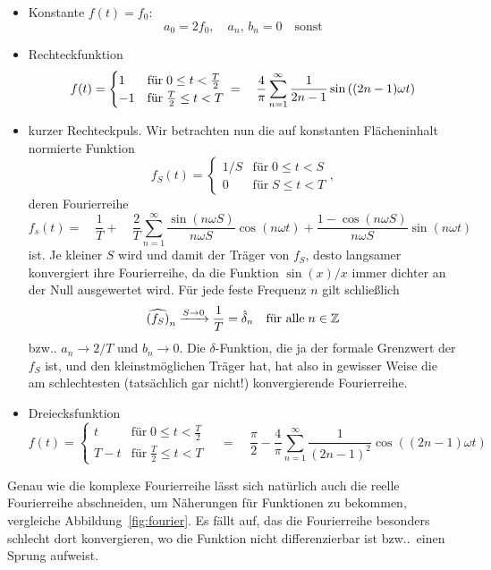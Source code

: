 \begin{itemize}
\item Konstante $f(t) = f_0$:
  \begin{equation}
    a_0 = 2 f_0,\quad a_n,\,b_n= 0\quad\text{sonst}
  \end{equation}
\item Rechteckfunktion
  \begin{equation}
    f(t) = \begin{cases}
      1 &\text{für}\; 0 \le t < \frac{T}{2} \\
      -1  &\text{für}\; \frac{T}{2} \le t < T
    \end{cases}\\
    = \quad\frac{4}{\pi}\sum_{n=1}^\infty
    \frac{1}{2n-1}\sin\left((2n-1)\omega t\right)
  \end{equation}
\item kurzer Rechteckpuls. Wir betrachten nun die auf konstanten
  Flächeninhalt normierte Funktion
  \begin{equation}
    f_S(t) = \begin{cases}
      1/S &\text{für}\; 0 \le t < S \\
      0  &\text{für}\; S \le t < T
    \end{cases},
  \end{equation}
  deren Fourierreihe
  \begin{equation}
    f_s(t) =
    \quad \frac{1}{T} +
    \quad\frac{2}{T}\sum_{n=1}^\infty
    \frac{\sin(n\omega S)}{n\omega S}\cos(n\omega t) +
    \frac{1-\cos(n\omega S)}{n\omega S}\sin(n\omega t)
  \end{equation}
  ist. Je kleiner $S$ wird und damit der Träger von $f_S$, desto
  langsamer konvergiert ihre Fourierreihe, da die Funktion $\sin(x)/x$
  immer dichter an der Null ausgewertet wird. Für jede feste Frequenz
  $n$ gilt schließlich
  \begin{equation}
    \widehat{\left(f_S\right)}_n \xrightarrow{S\to 0} \frac{1}{T} = \hat\delta_n
    \quad\text{für alle}\;n\in\mathbb{Z}
  \end{equation}
  bzw.. $a_n\to 2/T$ und $b_n\to 0$. Die $\delta$-Funktion, die ja der
  formale Grenzwert der $f_S$ ist, und den kleinstmöglichen
  Träger hat, hat also in gewisser Weise die am schlechtesten
  (tatsächlich gar nicht!) konvergierende Fourierreihe.
\item Dreiecksfunktion
  \begin{equation}
    f(t) = \begin{cases}
      t      &\text{für}\; 0 \le t < \frac{T}{2} \\
      T - t  &\text{für}\; \frac{T}{2} \le t < T
    \end{cases}\quad=\quad\frac{\pi}{2} -
    \frac{4}{\pi}\sum_{n=1}^\infty
    \frac{1}{(2n-1)^2}\cos\left((2n-1)\omega t\right)
  \end{equation}
\end{itemize}
Genau wie die komplexe Fourierreihe lässt sich natürlich auch die
reelle Fourierreihe abschneiden, um Näherungen für Funktionen zu
bekommen, vergleiche Abbildung~\ref{fig:fourier}. Es fällt auf, das
die Fourierreihe besonders schlecht dort konvergieren, wo die Funktion
nicht differenzierbar ist bzw..\ einen Sprung aufweist.

